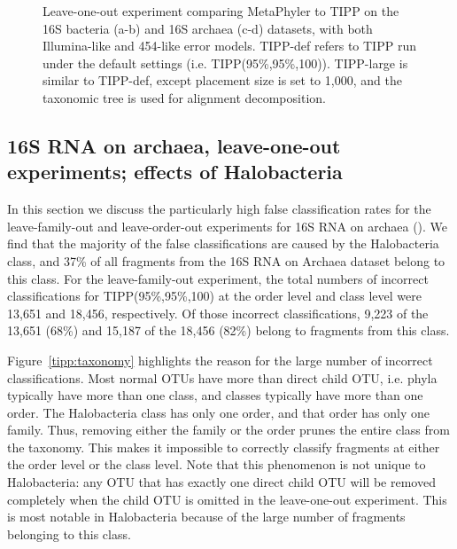 \begin{figure}[htpb]
\begin{center}

\hspace{-14pt}
\hspace{-14pt}

\end{center}
\caption{\label{tipp:leave_out_16} Leave-one-out experiment
          comparing MetaPhyler
          to TIPP on the 16S bacteria (a-b) and 16S archaea (c-d) datasets,
          with both Illumina-like and 454-like error models.
    TIPP-def refers to TIPP run
          under the default settings (i.e. TIPP(95\%,95\%,100)).
          TIPP-large is similar to TIPP-def, except placement size is set to 1,000, and the taxonomic tree is used for alignment decomposition.}
\end{figure}

\subsection{16S RNA on archaea, leave-one-out experiments; effects of Halobacteria}\label{supp:archaea}
In this section we discuss the particularly high false 
classification rates for the leave-family-out 
and leave-order-out experiments for 16S RNA on archaea ().  
We find that the majority of the false classifications are caused by the Halobacteria class,
and  37\% of all fragments from the 16S RNA on Archaea dataset
belong to this class.  
For the leave-family-out experiment, 
the total numbers of incorrect classifications for 
TIPP(95\%,95\%,100) at the order level and class level 
were 13,651 and 18,456, respectively.  
Of those incorrect classifications, 9,223 of the 13,651 (68\%) and 
15,187 of the 18,456 (82\%) belong to fragments from this class.

Figure~\ref{tipp:taxonomy} highlights the reason for the large number of incorrect classifications.  Most normal OTUs have more than direct child OTU, i.e. phyla typically have more than one class, and classes typically have more than one order.  The Halobacteria class has only one order, and that order has only one family.  Thus, removing either the family or the order prunes the entire class from the taxonomy.  This makes it impossible to correctly classify fragments at either the order level or the class level.  Note that this phenomenon is not unique to Halobacteria:  any OTU that has exactly one direct child OTU will 
be removed completely when the child OTU is omitted in the 
leave-one-out experiment.  
This is most notable in Halobacteria because of the large number of fragments belonging to this class.

